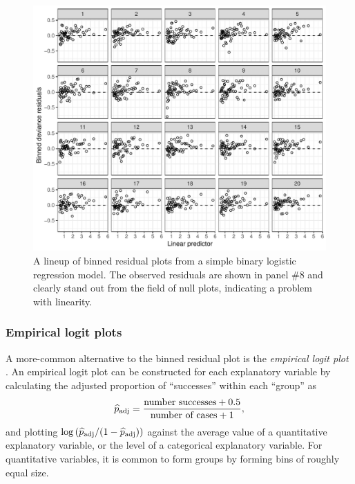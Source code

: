 \documentclass[12pt]{article}
\begin{document}
\begin{figure}
\centering
\includegraphics{figs/wells_binned_residuals.pdf}
\caption{\label{fig:binnedlineup} A lineup of binned residual plots from
a simple binary logistic regression model. The observed residuals are
shown in panel \#8 and clearly stand out from the field of null plots,
indicating a problem with linearity.}
\end{figure}

\hypertarget{empirical-logit-plots}{%
\subsubsection{Empirical logit plots}\label{empirical-logit-plots}}

A more-common alternative to the binned residual plot is the
\emph{empirical logit plot} \citep[c.f.,][]{stat2, ramsey2013}. An
empirical logit plot can be constructed for each explanatory variable by
calculating the adjusted proportion of ``successes'' within each
``group'' as \[
\widehat{p}_{\rm adj} = \frac{\text{number successes} + 0.5}{\text{number of cases} + 1},
\] and plotting
\(\log\left(\widehat{p}_{\rm adj} / (1- \widehat{p}_{\rm adj}) \right)\)
against the average value of a quantitative explanatory variable, or the
level of a categorical explanatory variable. For quantitative variables,
it is common to form groups by forming bins of roughly equal size.
\end{document}
